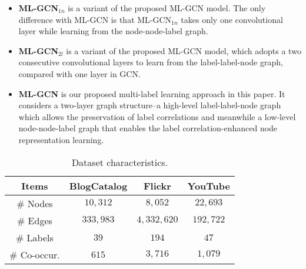\documentclass[conference]{IEEEtran}
\begin{document}
\begin{itemize}
    \item \textbf{ML-GCN$_{1n}$} is a variant of the proposed ML-GCN model. The only difference with ML-GCN is that ML-GCN$_{1n}$ takes only one convolutional layer while learning from the node-node-label  graph.
    \item \textbf{ML-GCN$_{2l}$} is a variant of the proposed ML-GCN model, which adopts a two consecutive convolutional layers to learn from the label-label-node graph, compared with one layer in GCN.
    \item \textbf{ML-GCN} is our proposed multi-label learning approach in this paper. It considers a two-layer graph structure--a high-level label-label-node graph which allows the preservation of label correlations and meanwhile a low-level node-node-label graph that enables the label correlation-enhanced node representation learning.
\end{itemize}

\begin{table}
\renewcommand{\arraystretch}{1.30}
\centering
\caption{Dataset characteristics.}
\label{tab:data}
    \begin{tabular}{c|c|c|c}
    \hline
    Items & BlogCatalog & Flickr & YouTube \\
    \hline
    \# Nodes & $10,312$  & $8,052$ & $22,693$ \\
    \hline
    \# Edges & $333,983$ & $4,332,620$ & $192,722$ \\
    \hline
    \# Labels & $39$ & $194$ & $47$ \\
    \hline
    \# Co-occur. & $615$ & $3,716$ & $1,079$ \\
    \hline
    \end{tabular}
\end{table}

\
\end{document}
